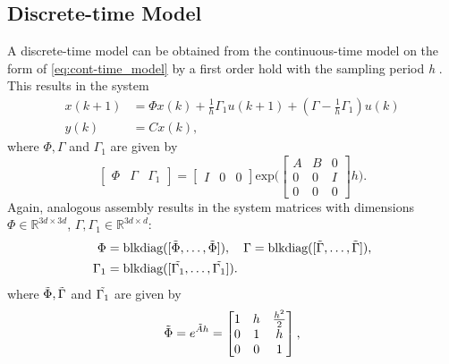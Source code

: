 \documentclass[final]{LTHtwocol} %
\begin{document}
\subsection{Discrete-time Model}
\label{sec:discretization}
A discrete-time model can be obtained from the continuous-time model on the form of \eqref{eq:cont-time_model} by a first order hold with the sampling period \textit{h} \cite{Wittenmark}. This results in the system 
\begin{equation}
    \label{eq:discr-time_model}
    \begin{split}
        x(k+1) & = \Phi x(k)+\frac{1}{h}\Gamma_1u(k+1) + (\Gamma-\frac{1}{h}\Gamma_1)u(k) \\
        y(k) & = Cx(k),
    \end{split}
\end{equation}
where $\Phi, \Gamma$ and $\Gamma_1$ are given by
\begin{equation}
    \begin{bmatrix} \Phi & \Gamma & \Gamma_1 \end{bmatrix} 
    = \begin{bmatrix} I & 0 & 0 \end{bmatrix}
    \mathrm{exp}\bigg(\begin{bmatrix} 
        A & B & 0 \\ 
        0 & 0 & I \\
        0 & 0 & 0
    \end{bmatrix}
    h \bigg ).
\end{equation} 
Again, analogous assembly results in the system matrices with dimensions $\Phi \in \mathbb{R}^{3d\times 3d}$, $\Gamma, \Gamma_1 \in \mathbb{R}^{3d\times d}$: 
\begin{equation}
    \begin{split}
        \Phi & = \textrm{blkdiag}([\Tilde{\Phi},\dots,\Tilde{\Phi}]), \quad 
        \Gamma  = \textrm{blkdiag}([\Tilde{\Gamma},\dots,\Tilde{\Gamma}]), \\
        \Gamma_1 & = \textrm{blkdiag}([\Tilde{\Gamma_1},\dots,\Tilde{\Gamma_1}]).
    \end{split}
\end{equation}
where $\Tilde{\Phi}, \Tilde{\Gamma}$ and $\Tilde{\Gamma_1}$ are given by
\begin{equation}
    \Tilde{\Phi} = e^{\Tilde{A}h} = 
    \begin{bmatrix}
        1 & h & \frac{h^2}{2} \\
        0 & 1 & h \\
        0 & 0 & 1
    \end{bmatrix},
\end{equation}
\end{document}

